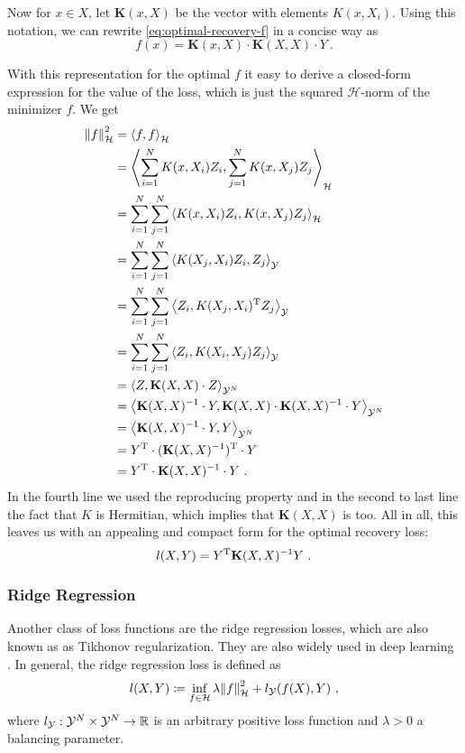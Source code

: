 Now for $x \in X$, let $\mathbf{K}(x, X)$ be the vector with elements $K(x, X_i)$.
Using this notation, we can rewrite \cref{eq:optimal-recovery-f} in a concise way as
\begin{equation}
	f(x) = \mathbf{K}(x, X) \cdot \mathbf{K}(X, X) \cdot Y \ .
\end{equation}

With this representation for the optimal $f$ it easy to derive a closed-form expression for the value of the loss, which is just the squared $\mathcal{H}$-norm of the minimizer $f$.
We get
\begin{align}
	\norm{f}_\mathcal{H}^2 &= \left< f, f\right>_\mathcal{H}\\
	&= \left< \sum_{i=1}^N K(x, X_i) Z_i, \sum_{j=1}^N K(x, X_j) Z_j \right>_\mathcal{H}\\
	&= \sum_{i=1}^N \sum_{j=1}^N \left< K(x, X_i) Z_i, K(x, X_j) Z_j \right>_\mathcal{H}\\
	&= \sum_{i=1}^N \sum_{j=1}^N \left< K(X_j, X_i)Z_i, Z_j \right>_{\mathcal{Y}}\\
	&= \sum_{i=1}^N \sum_{j=1}^N \left< Z_i, K(X_j, X_i)^{\mathrm{T}} Z_j \right>_{\mathcal{Y}}\\
	&= \sum_{i=1}^N \sum_{j=1}^N \left< Z_i, K(X_i, X_j) Z_j \right>_{\mathcal{Y}}\\
	&= \left< Z, \mathbf{K}(X, X) \cdot Z\right >_{\mathcal{Y}^N}\\
	&= \left< \mathbf{K}(X, X)^{-1} \cdot Y, \mathbf{K}(X, X) \cdot \mathbf{K}(X, X)^{-1} \cdot Y\right >_{\mathcal{Y}^N} \\
	&= \left< \mathbf{K}(X, X)^{-1} \cdot Y,  Y\right >_{\mathcal{Y}^N}\\
	&= Y^{\mathrm{T}} \cdot (\mathbf{K}(X, X)^{-1})^{\mathrm{T}} \cdot Y\\
	&=  Y^{\mathrm{T}} \cdot \mathbf{K}(X, X)^{-1} \cdot Y \ .
\end{align}
In the fourth line we used the reproducing property and in the second to last line the fact that $K$ is Hermitian, which implies that $\mathbf{K}(X, X)$ is too.
All in all, this leaves us with an appealing and compact form for the optimal recovery loss:
\begin{equation}
	\label{eq:optimal-recovery-loss-closed-form}
	l(X, Y) = Y^{\mathrm{T}} \mathbf{K}(X, X)^{-1} Y \ .
\end{equation}

\subsubsection{Ridge Regression}

Another class of loss functions are the ridge regression losses, which are also known as as Tikhonov regularization.
They are also widely used in deep learning \cite{goodfellow16}.
In general, the ridge regression loss is defined as
\begin{equation}
	\label{eq:ridge-regression-loss}
	l(X, Y) \coloneqq \inf_{f \in \mathcal{H}} \lambda \norm{f}_\mathcal{H}^2 
	+ l_{\mathcal{Y}} (f(X), Y) \ ,
\end{equation}
where $l_{\mathcal{Y}}: \mathcal{Y}^N \times \mathcal{Y}^N \rightarrow \mathbb{R}$ is an arbitrary positive loss function and $\lambda > 0$ a balancing parameter.


